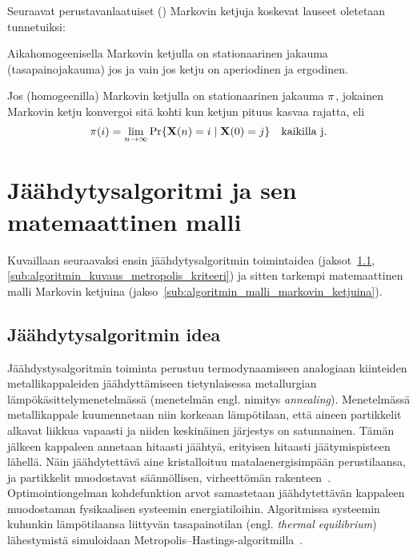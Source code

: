 Seuraavat perustavanlaatuiset (\cite{laarhoven, salamonetal}) Markovin ketjuja koskevat lauseet oletetaan tunnetuiksi:
\begin{lause}
    \label{lause:ketjun_stat_jakauma}
    Aikahomogeenisella Markovin ketjulla on stationaarinen jakauma (tasapainojakauma) jos ja vain jos ketju on aperiodinen ja ergodinen.
\end{lause}
\begin{lause}
    \label{lause:stat_jakauman_konvergenssi}
    Jos (homogeenilla) Markovin ketjulla on stationaarinen jakauma $\mathbf{\pi}$, jokainen Markovin ketju konvergoi sitä kohti kun ketjun pituus kasvaa rajatta, eli
    \begin{equation}
        \mathbf{\pi}(i) = \lim_{n \to \infty} \Pr\{\mathbf{X}(n) = i \mid \mathbf{X}(0) = j\} \quad \text{kaikilla j}.
    \end{equation}
\end{lause}

\section{Jäähdytysalgoritmi ja sen matemaattinen malli}
\label{sec:algoritmin_matemaattinen_malli}

Kuvaillaan seuraavaksi ensin jäähdytysalgoritmin toimintaidea (jaksot~\ref{sub:jaahdytysalgoritmin_idea}, \ref{sub:algoritmin_kuvaus_metropolis_kriteeri})
ja sitten tarkempi matemaattinen malli Markovin ketjuina (jakso~\ref{sub:algoritmin_malli_markovin_ketjuina}).

\subsection{Jäähdytysalgoritmin idea}
\label{sub:jaahdytysalgoritmin_idea}

Jäähdystysalgoritmin toiminta perustuu termodynaamiseen analogiaan kiinteiden metallikappaleiden jäähdyttämiseen tietynlaisessa metallurgian lämpökäsittelymenetelmässä (menetelmän engl. nimitys \emph{annealing}).
Menetelmässä metallikappale kuumennetaan niin korkeaan lämpötilaan, että aineen partikkelit alkavat liikkua vapaasti ja niiden keskinäinen järjestys on satunnainen.
Tämän jälkeen kappaleen annetaan hitaasti jäähtyä, erityisen hitaasti jäätymispisteen lähellä.
Näin jäähdytettävä aine kristalloituu matalaenergisimpään perustilaansa,
ja partikkelit muodostavat säännöllisen, virheettömän rakenteen~\cite{kirkpatrick83, laarhoven}.
Optimointiongelman kohdefunktion arvot samastetaan jäähdytettävän kappaleen muodostaman fysikaalisen systeemin energiatiloihin.
Algoritmissa systeemin kuhunkin lämpötilaansa liittyvän tasapainotilan (engl. \emph{thermal equilibrium}) lähestymistä simuloidaan Metropolis--Hastings-algoritmilla~\cite{kirkpatrick83, salamonetal}.

